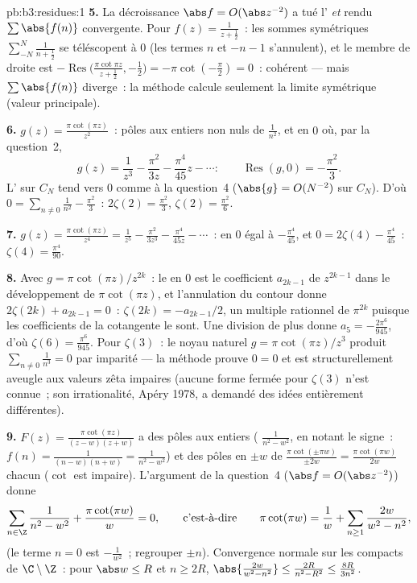 \begin{solution}{pb:b3:residues:1}
\textbf{5.} La décroissance $\abs f = O(\abs z^{-2})$ a tué
l' \emph{et} rendu $\sum\abs{f(n)}$
convergente. Pour $f(z) = \frac1{z + \frac12}$~: les sommes
symétriques $\sum_{-N}^N\frac1{n + \frac12}$ se téléscopent
à $0$ (les termes $n$ et $-n - 1$ s'annulent), et le membre
de droite est $-\operatorname{Res}\bigl(\frac{\pi\cot\pi
z}{z + \frac12}, -\frac12\bigr) = -\pi\cot(-\frac\pi2) =
0$~: cohérent --- mais $\sum\abs{f(n)}$ diverge~: la méthode
calcule seulement la limite symétrique (valeur principale).

\textbf{6.} $g(z) = \frac{\pi\cot(\pi z)}{z^2}$~: pôles aux
entiers non nuls de  $\frac1{n^2}$, et en $0$ où, par
la question~2,
\[
g(z) = \frac1{z^3} - \frac{\pi^2}{3z} - \frac{\pi^4}{45}z -
\cdots :
\qquad \operatorname{Res}(g, 0) = -\frac{\pi^2}3 .
\]
L' sur $C_N$ tend vers $0$ comme à la
question~4 ($\abs{g} = O(N^{-2})$ sur $C_N$). D'où $0 =
\sum_{n\neq0}\frac1{n^2} - \frac{\pi^2}3$~: $2\zeta(2) =
\frac{\pi^2}3$, $\zeta(2) = \frac{\pi^2}6$.

\textbf{7.} $g(z) = \frac{\pi\cot(\pi z)}{z^4} =
\frac1{z^5} - \frac{\pi^2}{3z^3} - \frac{\pi^4}{45z} -
\cdots$~:  en $0$ égal à $-\frac{\pi^4}{45}$, et $0 =
2\zeta(4) - \frac{\pi^4}{45}$~: $\zeta(4) =
\frac{\pi^4}{90}$.

\textbf{8.} Avec $g = \pi\cot(\pi z)/z^{2k}$~: le  en
$0$ est le coefficient $a_{2k-1}$ de $z^{2k-1}$ dans le
développement de $\pi\cot(\pi z)$, et l'annulation du
contour donne $2\zeta(2k) + a_{2k-1} = 0$~: $\zeta(2k) =
-a_{2k-1}/2$, un multiple rationnel de $\pi^{2k}$ puisque
les coefficients de la cotangente le sont. Une division de
plus donne $a_5 = -\frac{2\pi^6}{945}$, d'où $\zeta(6) =
\frac{\pi^6}{945}$. Pour $\zeta(3)$~: le noyau naturel $g =
\pi\cot(\pi z)/z^3$ produit $\sum_{n\neq0}\frac1{n^3} = 0$
par imparité --- la méthode prouve $0 = 0$ et est
structurellement aveugle aux valeurs zêta impaires (aucune
forme fermée pour $\zeta(3)$ n'est connue~; son
irrationalité, Apéry 1978, a demandé des idées entièrement
différentes).

\textbf{9.} $F(z) = \frac{\pi\cot(\pi z)}{(z - w)(z + w)}$
a des pôles aux entiers ( $\frac1{n^2 - w^2}$, en
notant le signe~: $f(n) = \frac1{(n-w)(n+w)} = \frac1{n^2 -
w^2}$) et des pôles  en $\pm w$ de 
$\frac{\pi\cot(\pm\pi w)}{\pm2w} = \frac{\pi\cot(\pi
w)}{2w}$ chacun ($\cot$ est impaire). L'argument de la
question~4 ($\abs f = O(\abs z^{-2})$) donne
\[
\sum_{n\in\Z}\frac1{n^2 - w^2} + \frac{\pi\cot(\pi w)}{w} =
0,
\qquad\text{c'est-à-dire}\qquad
\pi\cot(\pi w) = \frac1w + \sum_{n\geq1}\frac{2w}{w^2 -
n^2},
\]
(le terme $n = 0$ est $-\frac1{w^2}$~; regrouper $\pm n$).
Convergence normale sur les compacts de $\C\setminus\Z$~:
pour $\abs w \leq R$ et $n \geq 2R$, $\abs{\frac{2w}{w^2 -
n^2}} \leq \frac{2R}{n^2 - R^2} \leq \frac{8R}{3n^2}$.


\end{solution}
